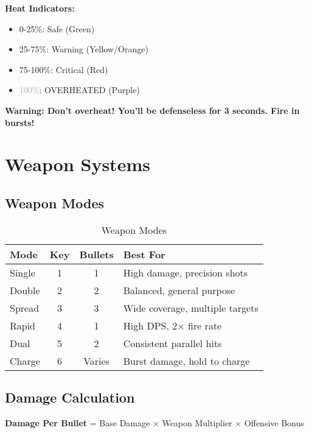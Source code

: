 \documentclass[11pt,a4paper]{article}
\newcommand{\infobox}[2]{%
    \vspace{0.3cm}
    \noindent\colorbox{#1!10}{%
        \parbox{\dimexpr\textwidth-2\fboxsep}{%
            \textcolor{#1}{\textbf{#2}}
        }
    }
    \vspace{0.3cm}
}
\begin{document}
\textbf{Heat Indicators:}
\begin{itemize}
    \item \textcolor{successcolor}{0-25\%}: Safe (Green)
    \item \textcolor{infocolor}{25-75\%}: Warning (Yellow/Orange)
    \item \textcolor{warningcolor}{75-100\%}: Critical (Red)
    \item \textcolor{darkgray}{100\%}: OVERHEATED (Purple)
\end{itemize}

\infobox{warningcolor}{\textbf{Warning:} Don't overheat! You'll be defenseless for 3 seconds. Fire in bursts!}

\section{Weapon Systems}

\subsection{Weapon Modes}

\begin{table}[h]
\centering
\small
\begin{tabularx}{\textwidth}{|l|c|c|X|}
\hline
\rowcolor{primarycolor!20}
\textbf{Mode} & \textbf{Key} & \textbf{Bullets} & \textbf{Best For} \\
\hline
Single & 1 & 1 & High damage, precision shots \\
\hline
Double & 2 & 2 & Balanced, general purpose \\
\hline
Spread & 3 & 3 & Wide coverage, multiple targets \\
\hline
Rapid & 4 & 1 & High DPS, 2× fire rate \\
\hline
Dual & 5 & 2 & Consistent parallel hits \\
\hline
Charge & 6 & Varies & Burst damage, hold to charge \\
\hline
\end{tabularx}
\caption{Weapon Modes}
\end{table}

\subsection{Damage Calculation}

\begin{center}
\large
\textbf{Damage Per Bullet} = Base Damage × Weapon Multiplier × Offensive Bonus
\end{center}
\end{document}
